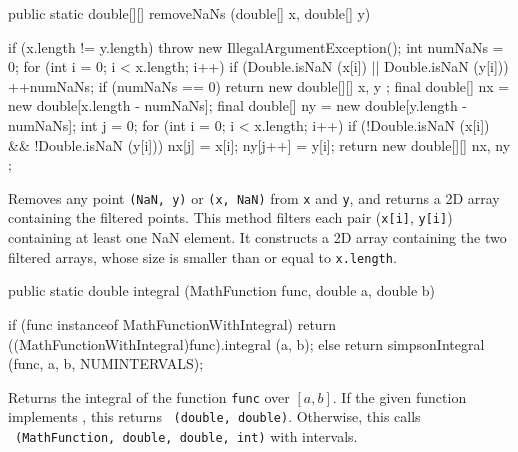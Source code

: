 \begin{htmlonly}
\end{htmlonly}
\begin{code}

   public static double[][] removeNaNs (double[] x, double[] y)\begin{hide} {
      if (x.length != y.length)
         throw new IllegalArgumentException();
      int numNaNs = 0;
      for (int i = 0; i < x.length; i++)
         if (Double.isNaN (x[i]) || Double.isNaN (y[i]))
            ++numNaNs;
      if (numNaNs == 0)
         return new double[][] { x, y };
      final double[] nx = new double[x.length - numNaNs];
      final double[] ny = new double[y.length - numNaNs];
      int j = 0;
      for (int i = 0; i < x.length; i++)
         if (!Double.isNaN (x[i]) && !Double.isNaN (y[i])) {
            nx[j] = x[i];
            ny[j++] = y[i];
         }
      return new double[][] { nx, ny };
   }\end{hide}
\end{code}
\begin{tabb}   Removes any point \texttt{(NaN, y)} or \texttt{(x, NaN)} from
 \texttt{x} and \texttt{y}, and returns a 2D array containing the filtered
 points. This method filters each pair (\texttt{x[i]}, \texttt{y[i]})
 containing at least one NaN element. It constructs a 2D array containing
 the two filtered arrays, whose size is smaller than or equal to
 \texttt{x.length}.
\end{tabb}
\begin{htmlonly}
\end{htmlonly}
\begin{code}

   public static double integral (MathFunction func, double a, double b) \begin{hide} {
      if (func instanceof MathFunctionWithIntegral)
         return ((MathFunctionWithIntegral)func).integral (a, b);
      else
         return simpsonIntegral (func, a, b, NUMINTERVALS);
   }\end{hide}
\end{code}
\begin{tabb}   Returns the integral of the function \texttt{func} over $[a, b]$.
 If the given function implements ,
 this returns
 ~\texttt{(double, double)}.
 Otherwise, this calls
 ~\texttt{(MathFunction, double, double, int)}
 with  intervals.
\end{tabb}
